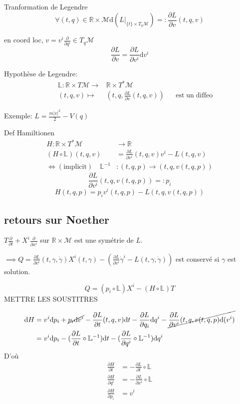\documentclass[a4paper,11pt]{article}
\renewcommand{\d}{{\mathrm{d}}}
\newcommand{\dr}[2]{\frac{\partial {#1}}{\partial{#2}}}
\begin{document}
Tranformation de Legendre
$$\forall (t,q) \in \mathbb{R}\times\mathcal{M} \d (L|_{\{t\}\times T_q\mathcal{M}}) =: \dr{L}{v}(t,q,v)$$

en coord loc, $v=v^i\frac{\partial}{\partial q^i} \in T_q\mathcal{M}$
$$\dr{L}{v} = \dr{L}{v^i} \d v^i$$

Hypothèse de Legendre: 
\begin{align*}
&&\mathbb{L}: \mathbb{R}\times T\mathcal{M} \to & \mathbb{R}\times T^*\mathcal{M}\\
&&(t,q,v)\mapsto & (t,q, \dr{L}{v}(t,q,v)) &&
\mathrm{est}\; \mathrm{un}\; \mathrm{diffeo}
\end{align*}

Exemple: $L = \frac{m |v|^2}{2} - V(q)$

Def Hamiltionen
\begin{align*}
H : \mathbb{R}\times T^*\mathcal{M} &\to \mathbb{R}\\
(H\circ\mathbb{L})(t,q,v) &= \dr{L}{v^i}(t,q,v) v^i - L(t,q,v)\\
\iff (\mathrm{implicit})\quad  \mathbb{L}^{-1}&: (t,q,p)\to (t,q,v(t,q,p))
\end{align*}
$$\dr{L}{v^i}(t,q,v(t,q,p)) =: p_i $$
$$H(t,q,p) = p_i v^i(t,q,p) - L(t,q,v(t,q,p))$$

\subsection{retours sur Noether}
$T\frac{\partial}{\partial t} + X^i \frac{\partial}{\partial x^i}$ sur $\mathbb{R}\times\mathcal{M}$ est une symétrie de $L$.

$\implies Q = \dr{L}{v^i}(t,\gamma, \dot\gamma)X^i(t,\gamma) - (\dr{L}{v^i}\dot\gamma^i - L(t,\gamma,\dot\gamma))$ est conservé si $\gamma$ est solution.

$$Q = (p_i \circ \mathbb{L})X^i - (H\circ\mathbb{L})T$$
METTRE LES SOUSTITRES

\begin{align*}
\d H &= v^i \d p_i + \cancel{p_i\d v^i} - \dr{L}{t}(t,q,v) \d t - \dr{L}{q_i}\d q^i - \cancel{\dr{L}{v^i}(t,q,v(t,q,p) \d(v^i)}\\
&= v^i\d p_i - (\dr{L}{t}\circ \mathbb{L}^{-1})\d t - (\dr{L}{q^i}\circ \mathbb{L}^{-1}) \d q^i
\end{align*}
D'où 
\begin{align}
	\dr{H}{t} &= -\dr{L}{t}\circ \mathbb{L}\\
	\dr{H}{q^i} &= - \dr{L}{x^i} \circ \mathbb{L}\\
	\dr{H}{p_i} &= v^i
\end{align}
\end{document}
